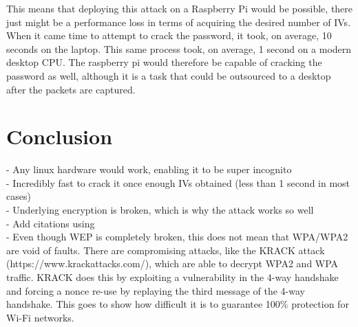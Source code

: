 \documentclass[10pt, titlepage]{article}
\begin{document}
This means that deploying this attack on a Raspberry Pi would be possible, there just might be a performance loss in terms of acquiring the desired number of IVs. When it came time to attempt to crack the password, it took, on average, 10 seconds on the laptop. This same process took, on average, 1 second on a modern desktop CPU. The raspberry pi would therefore be capable of cracking the password as well, although it is a task that could be outsourced to a desktop after the packets are captured.



\section{Conclusion}
- Any linux hardware would work, enabling it to be super incognito\\
- Incredibly fast to crack it once enough IVs obtained (less than 1 second in most cases)\\
- Underlying encryption is broken, which is why the attack works so well\\
- Add citations using \cite{klein}\\

- Even though WEP is completely broken, this does not mean that WPA/WPA2 are void of faults. There are compromising attacks, like the KRACK attack (https://www.krackattacks.com/), which are able to decrypt WPA2 and WPA traffic. KRACK does this by exploiting a vulnerability in the 4-way handshake and forcing a nonce re-use by replaying the third message of the 4-way handshake. This goes to show how difficult it is to guarantee 100\% protection for Wi-Fi networks.


\newpage

{}
\newpage


\end{document}
